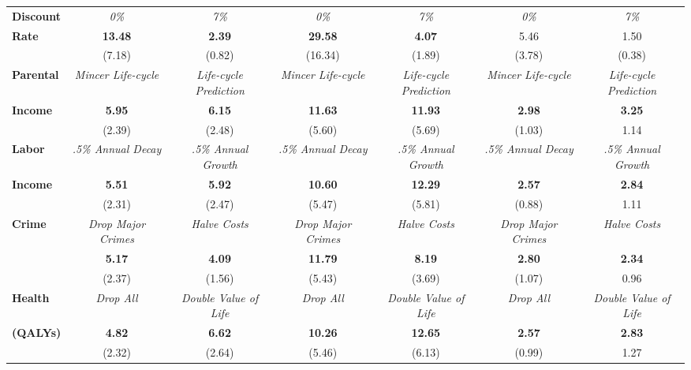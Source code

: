 \begin{tabular}{>{\bfseries}lcc|cc|cc}
Discount 	&	\textit{0\%}	&	\textit{7\%}	&	\textit{0\%}	&	\textit{7\%}	&	\textit{0\%}	&	\textit{7\%}	\\
Rate	&	\textbf{13.48}	&	\textbf{2.39}	&	\textbf{29.58}	&	\textbf{4.07}	&	5.46	&	1.50	\\
	&	(7.18)	&	(0.82)	&	(16.34)	&	(1.89)	&	(3.78)	&	(0.38)	\\ \midrule
Parental	&	\textit{Mincer Life-cycle}	&	\textit{Life-cycle Prediction}	&	\textit{Mincer Life-cycle}	&	\textit{Life-cycle Prediction}	&	\textit{Mincer Life-cycle}	&	\textit{Life-cycle Prediction}	\\
Income	&	\textbf{5.95}	&	\textbf{6.15}	&	\textbf{11.63}	&	\textbf{11.93}	&	\textbf{2.98}	&	\textbf{3.25}	\\
	&	(2.39)	&	(2.48)	&	(5.60)	&	(5.69)	&	(1.03)	&	1.14	\\ \midrule
Labor	&	\textit{.5\% Annual Decay}	&	\textit{.5\% Annual Growth}	&	\textit{.5\% Annual Decay}	&	\textit{.5\% Annual Growth}	&	\textit{.5\% Annual Decay}	&	\textit{.5\% Annual Growth}	\\
Income	&	\textbf{5.51}	&	\textbf{5.92}	&	\textbf{10.60}	&	\textbf{12.29}	&	\textbf{2.57}	&	\textbf{2.84}	\\
	&	(2.31)	&	(2.47)	&	(5.47)	&	(5.81)	&	(0.88)	&	1.11	\\ \midrule
Crime	&	\textit{Drop Major Crimes}	&	\textit{Halve Costs}	&	\textit{Drop Major Crimes}	&	\textit{Halve Costs}	&	\textit{Drop Major Crimes}	&	\textit{Halve Costs}	\\
	&	\textbf{5.17}	&	\textbf{4.09}	&	\textbf{11.79}	&	\textbf{8.19}	&	\textbf{2.80}	&	\textbf{2.34}	\\
	&	(2.37)	&	(1.56)	&	(5.43)	&	(3.69)	&	(1.07)	&	0.96	\\
Health	&	\textit{Drop All}	&	\textit{Double Value of Life}	&	\textit{Drop All}	&	\textit{Double Value of Life}	&	\textit{Drop All}	&	\textit{Double Value of Life}	\\
(QALYs)	&	\textbf{4.82}	&	\textbf{6.62}	&	\textbf{10.26}	&	\textbf{12.65}	&	\textbf{2.57}	&	\textbf{2.83}	\\
	&	(2.32)	&	(2.64)	&	(5.46)	&	(6.13)	&	(0.99)	&	1.27	\\ \bottomrule
\end{tabular} 
